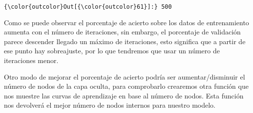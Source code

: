 \documentclass[11pt]{article}
\begin{document}
\begin{Verbatim}[commandchars=\\\{\}]
{\color{outcolor}Out[{\color{outcolor}61}]:} 500
\end{Verbatim}
            
    Como se puede observar el porcentaje de acierto sobre los datos de
entrenamiento aumenta con el número de iteraciones, sin embargo, el
porcentaje de validación parece descender llegado un máximo de
iteraciones, esto significa que a partir de ese punto hay sobreajuste,
por lo que tendremos que usar un número de iteraciones menor.

Otro modo de mejorar el porcentaje de acierto podría ser
aumentar/disminuir el número de nodos de la capa oculta, para
comprobarlo crearemos otra función que nos muestre las curvas de
aprendizaje en base al número de nodos. Esta función nos devolverá el
mejor número de nodos internos para nuestro modelo.
\end{document}
